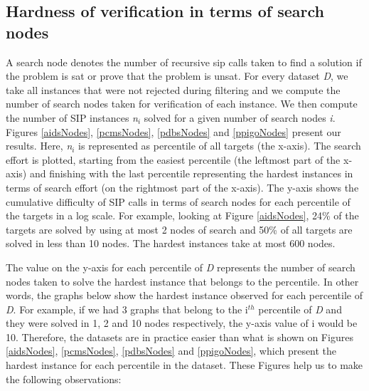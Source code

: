 \documentclass{l4proj}
\newcounter{example}[section]
\begin{document}
\subsection{Hardness of verification in terms of search nodes}
\label{subsec:hardnessVerifcNodes}
A search node denotes the number of recursive \gls{sip} calls taken to find a solution if the problem is \gls{sat} or prove that the problem is \gls{unsat}. For every dataset \emph{D}, we take all instances that were not rejected during filtering and we compute the number of search nodes taken for verification of each instance. We then compute the number of SIP instances \emph{n$_{i}$} solved for a given number of search nodes \emph{i}. Figures \ref{aidsNodes}, \ref{pcmsNodes}, \ref{pdbsNodes} and \ref{ppigoNodes} present our results. Here, \emph{n$_{i}$} is represented as percentile of all targets (the x-axis). The search effort is plotted, starting from the easiest percentile (the leftmost part of the x-axis) and finishing with the last percentile representing the hardest instances in terms of search effort (on the rightmost part of the x-axis). The y-axis shows the cumulative difficulty of SIP calls in terms of search nodes for each percentile of the targets in a log scale. For example, looking at Figure \ref{aidsNodes}, 24\% of the targets are solved by using at most 2 nodes of search and 50\% of all targets are solved in less than 10 nodes. The hardest instances take at most 600 nodes.

The value on the y-axis for each percentile of \emph{D} represents the number of search nodes taken to solve the hardest instance that belongs to the percentile. In other words, the graphs below show the hardest instance observed for each percentile of \emph{D}. For example, if we had 3 graphs that belong to the i$^{th}$ percentile of \emph{D} and they were solved in 1, 2 and 10 nodes respectively, the y-axis value of i would be 10. Therefore, the datasets are in practice easier than what is shown on Figures \ref{aidsNodes}, \ref{pcmsNodes}, \ref{pdbsNodes} and \ref{ppigoNodes}, which present the hardest instance for each percentile in the dataset. These Figures help us to make the following observations:
\end{document}

